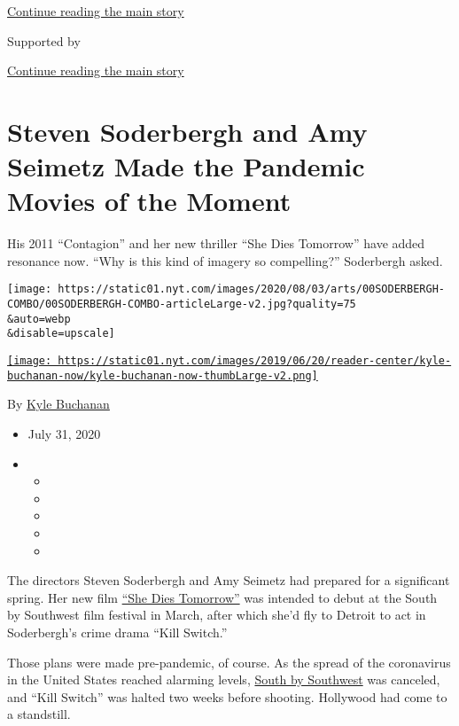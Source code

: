 \protect\hyperlink{after-top}{Continue reading the main story}

Supported by

\protect\hyperlink{after-sponsor}{Continue reading the main story}

\hypertarget{steven-soderbergh-and-amy-seimetz-made-the-pandemic-movies-of-the-moment}{%
\section{Steven Soderbergh and Amy Seimetz Made the Pandemic Movies of
the
Moment}\label{steven-soderbergh-and-amy-seimetz-made-the-pandemic-movies-of-the-moment}}

His 2011 ``Contagion'' and her new thriller ``She Dies Tomorrow'' have
added resonance now. ``Why is this kind of imagery so compelling?''
Soderbergh asked.

\texttt{[image: https://static01.nyt.com/images/2020/08/03/arts/00SODERBERGH-COMBO/00SODERBERGH-COMBO-articleLarge-v2.jpg?quality=75\\\&auto=webp\\\&disable=upscale]}

\href{https://www.nytimes.com/by/kyle-buchanan}{\texttt{[image: https://static01.nyt.com/images/2019/06/20/reader-center/kyle-buchanan-now/kyle-buchanan-now-thumbLarge-v2.png]}}

By \href{https://www.nytimes.com/by/kyle-buchanan}{Kyle Buchanan}

\begin{itemize}
\item
  July 31, 2020
\item
  \begin{itemize}
  \item
  \item
  \item
  \item
  \item
  \end{itemize}
\end{itemize}

The directors Steven Soderbergh and Amy Seimetz had prepared for a
significant spring. Her new film
\href{https://www.youtube.com/watch?v=hcMFjCPkP3M}{``She Dies
Tomorrow''} was intended to debut at the South by Southwest film
festival in March, after which she'd fly to Detroit to act in
Soderbergh's crime drama ``Kill Switch.''

Those plans were made pre-pandemic, of course. As the spread of the
coronavirus in the United States reached alarming levels,
\href{https://www.nytimes.com/2020/03/06/arts/music/sxsw-cancelled.html}{South
by Southwest} was canceled, and ``Kill Switch'' was halted two weeks
before shooting. Hollywood had come to a standstill.

